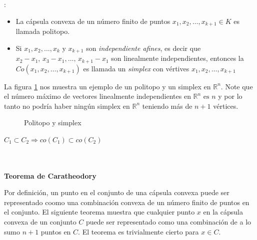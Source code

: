 
{:
\begin{itemize}
   \item La c\'apsula convexa de un n\'umero finito de puntos $x_1, x_2, \ldots ,x_{k+1} \in K$ es llamada politopo.
   \item Si $x_1, x_2, \ldots ,x_{k}\,\,\mbox{y}\,\, x_{k+1} $ son {\itshape independiente afines}, es decir
         que $x_2-x_1,\,x_3-x_1, \ldots , \, x_{k+1}-x_1$ son linealmente independientes, entonces la 
         $Co(x_1, x_2, \ldots ,x_{k+1})$ es llamada un {\itshape simplex} con v\'ertives $x_1, x_2, 
         \ldots ,x_{k+1}$
\end{itemize}
\label{def-poli-simplex}
}

La figura \ref{im2} nos muestra un ejemplo de un politopo y un simplex en $\mathbb{R}^n$. Note que el n\'umero
m\'aximo de vectores linealmente independientes en $\mathbb{R}^n \,\, \mbox{es}\,\, n$ y por lo tanto no
podr\'ia haber ning\'un simplex en $\mathbb{R}^n$ teniendo m\'as de $n+1$ v\'ertices.


\begin{figure}
   \centering
   
   \caption{Politopo y simplex}\label{figure: Politopo y Simplex}
   \label{im2}
\end{figure} 

{\corolario $C_1 \subset C_2 \Longrightarrow co(C_1) \subset co(C_2)$}\label{cor2}\\ \\
\

\textbf{Teorema de Caratheodory \cite{no-lineal}} 

Por definici\'on, un punto en el conjunto de una c\'apsula convexa puede ser representado coomo una
combinaci\'on convexa de un n\'umero finito de puntos en el conjunto. El siguiente teorema muestra 
que cualquier punto $x$ en la c\'apsula convexa de un conjunto $C$ puede ser representado como una 
combinaci\'on de a lo sumo $n+1$ puntos en $C$. El teorema es trivialmente cierto para $x\in C$.

